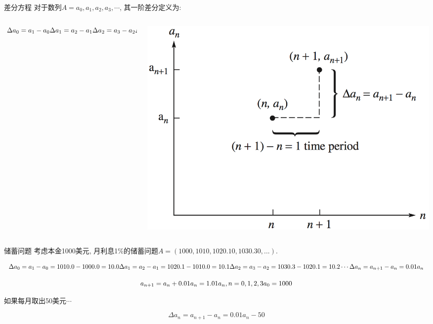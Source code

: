 \documentclass[
  ignorenonframetext,
]{ctexbeamer}
\begin{document}
\begin{frame}{差分方程}
\label{ux5deeux5206ux65b9ux7a0b}
对于数列\(A = {a_0, a_1, a_2, a_3, \cdots}\), 其一阶差分定义为:

\begin{columns}[T]
\begin{column}{0.4\textwidth}
\[
\Delta a_0 = a_1 - a_0 \\
\Delta a_1 = a_2 - a_1 \\
\Delta a_2 = a_3 - a_2 \\
\Delta a_3 = a_4 - a_3 \\
\cdots \\
\Delta a_n = a_{n+1} - a_n
\]
\end{column}

\begin{column}{0.6\textwidth}
\includegraphics{images/difference.png}
\end{column}
\end{columns}
\end{frame}

\begin{frame}{储蓄问题}
\label{ux50a8ux84c4ux95eeux9898}
考虑本金1000美元,
月利息1\%的储蓄问题\(A = (1000, 1010, 1020.10, 1030.30, ...)\).

\[
\Delta a_0 = a_1 - a_0 = 1010.0 - 1000.0 = 10.0 \\
\Delta a_1 = a_2 - a_1 = 1020.1 - 1010.0 = 10.1 \\
\Delta a_2 = a_3 - a_2 = 1030.3 - 1020.1 = 10.2 \\
\cdots \\
\Delta a_n = a_{n+1} - a_n = 0.01a_n \\
\]

\[
a_{n+1} = a_n + 0.01a_n = 1.01a_n, n = 0, 1, 2, 3 \\
a_0 = 1000
\]

如果每月取出50美元\(\cdots\)

\[\Delta a_n = a_{n+1} - a_n = 0.01a_n - 50\]
\end{frame}
\end{document}
